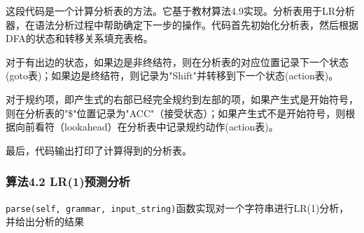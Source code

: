 \documentclass[lang=cn,11pt,a4paper]{elegantpaper}
\begin{document}
这段代码是一个计算分析表的方法。它基于教材算法4.9实现。分析表用于LR分析器，在语法分析过程中帮助确定下一步的操作。代码首先初始化分析表，然后根据DFA的状态和转移关系填充表格。

对于有出边的状态，如果边是非终结符，则在分析表的对应位置记录下一个状态(goto表)；如果边是终结符，则记录为"Shift"并转移到下一个状态(action表)。

对于规约项，即产生式的右部已经完全规约到左部的项，如果产生式是开始符号，则在分析表的"\$"位置记录为"ACC"（接受状态）；如果产生式不是开始符号，则根据向前看符（lookahead）在分析表中记录规约动作(action表)。

最后，代码输出打印了计算得到的分析表。

\subsubsection{算法4.2 LR(1)预测分析}

\lstinline{parse(self, grammar, input_string)}函数实现对一个字符串进行LR(1)分析，并给出分析的结果
\end{document}
